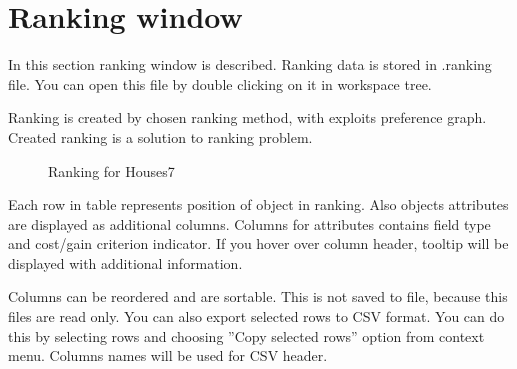 \section{Ranking window}\label{section:ranking}

In this section ranking window is described. Ranking data is stored in .ranking file. You can open this file by double clicking on it in workspace tree.

Ranking is created by chosen ranking method, with exploits preference graph. Created ranking is a solution to ranking problem.

\begin{figure*}[!ht] 
	\centering
	\caption{Ranking for Houses7}
\end{figure*}

Each row in table represents position of object in ranking. Also objects attributes are displayed as additional columns. Columns for attributes contains field type and cost/gain criterion indicator. If you hover over column header, tooltip will be displayed with additional information.

Columns can be reordered and are sortable. This is not saved to file, because this files are read only. You can also export selected rows to CSV format. You can do this by selecting rows and choosing ''Copy selected rows'' option from context menu. Columns names will be used for CSV header.

\vfill\newpage